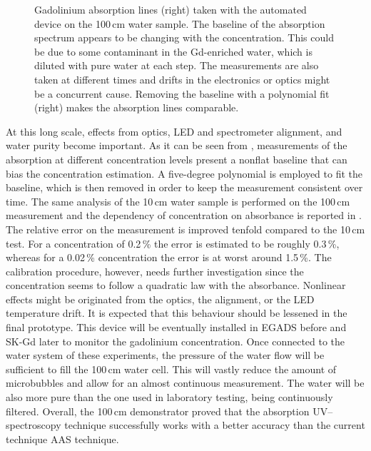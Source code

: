 \begin{figure}
	\centering
	\resizebox{\linewidth}{!}{}
	\caption[Gadolinium absorption spectrum of the 100\,cm water sample]%
		{Gadolinium absorption lines (right) taken with the automated device on the 100\,cm water sample.
		The baseline of the absorption spectrum appears to be changing with the concentration.
		This could be due to some contaminant in the Gd-enriched water, which is diluted with pure water %
		at each step.
		The measurements are also taken at different times and drifts in the electronics or optics might be a %
		concurrent cause.
		Removing the baseline with a polynomial fit (right) makes the absorption lines comparable.}
	\label{fig:gad_fit}
\end{figure}

At this long scale, effects from optics, LED and spectrometer alignment, and water purity become important.
As it can be seen from , measurements of the absorption at different concentration levels %
present a nonflat baseline that can bias the concentration estimation.
A five-degree polynomial is employed to fit the baseline, which is then removed in order to keep the measurement consistent over time.
The same analysis of the 10\,cm water sample is performed on the 100\,cm measurement %
and the dependency of concentration on absorbance is reported in .
The relative error on the measurement is improved tenfold compared to the 10\,cm test.
For a concentration of 0.2\,\% the error is estimated to be roughly 0.3\,\%, %
whereas for a 0.02\,\% concentration the error is at worst around 1.5\,\%. 	%
The calibration procedure, however, needs further investigation since %
the concentration seems to follow a quadratic law with the absorbance.
Nonlinear effects might be originated from the optics, the alignment, or the LED temperature drift.
It is expected that this behaviour should be lessened in the final prototype.
This device will be eventually installed in EGADS before and SK-Gd later to monitor the gadolinium concentration.
Once connected to the water system of these experiments, the pressure of the water flow will %
be sufficient to fill the 100\,cm water cell.
This will vastly reduce the amount of microbubbles and allow for an almost continuous measurement.
The water will be also more pure than the one used in laboratory testing, being continuously filtered.
Overall, the 100\,cm demonstrator proved that the absorption UV--spectroscopy technique successfully works %
with a better accuracy than the current technique AAS technique.



